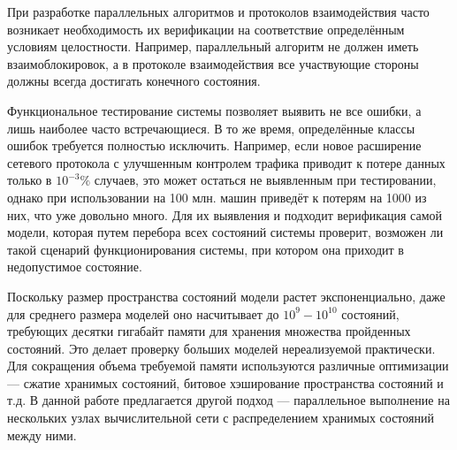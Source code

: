 \Introduction

При разработке параллельных алгоритмов и протоколов взаимодействия
часто возникает необходимость их верификации на соответствие
определённым условиям целостности. Например, параллельный алгоритм
не должен иметь взаимоблокировок, а в протоколе взаимодействия все
участвующие стороны должны всегда достигать конечного состояния.

Функциональное тестирование системы позволяет выявить не все ошибки, а
лишь наиболее часто встречающиеся. В то же время, определённые классы
ошибок требуется полностью исключить. Например, если новое расширение
сетевого протокола с улучшенным контролем трафика приводит к потере
данных только в $10^{-3}\%$ случаев, это может остаться не выявленным при
тестировании, однако при использовании на 100 млн. машин приведёт к
потерям на 1000 из них, что уже довольно много. Для их выявления и
подходит верификация самой модели, которая путем перебора всех
состояний системы проверит, возможен ли такой сценарий
функционирования системы, при котором она приходит в недопустимое
состояние.

Поскольку размер пространства состояний модели растет экспоненциально,
даже для среднего размера моделей оно насчитывает до $10^9 - 10^{10}$
состояний, требующих десятки гигабайт памяти для хранения множества
пройденных состояний. Это делает проверку больших моделей
нереализуемой практически. Для сокращения объема требуемой памяти
используются различные оптимизации — сжатие хранимых состояний,
битовое хэширование пространства состояний и т.д. В
данной работе предлагается другой подход — параллельное выполнение на
нескольких узлах вычислительной сети с распределением хранимых
состояний между ними.

